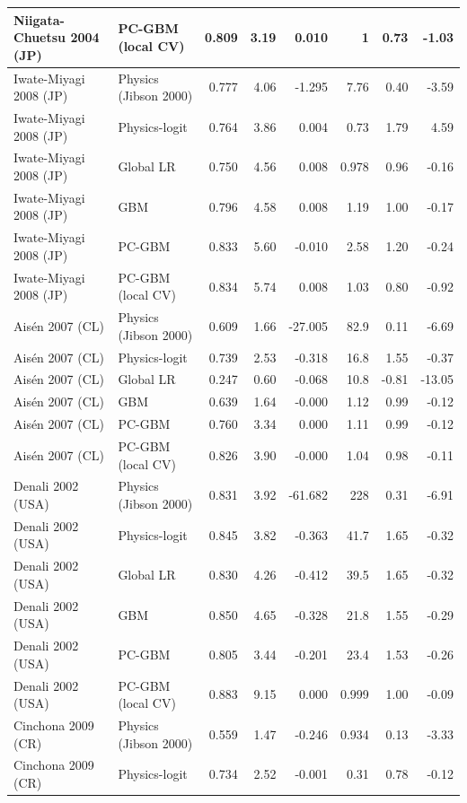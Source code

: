 \begin{longtable}{llrrrrrr}
Niigata-Chuetsu 2004 (JP) & PC-GBM (local CV) & 0.809 & 3.19 & 0.010 & 1 & 0.73 & -1.03\\
\midrule
Iwate-Miyagi 2008 (JP) & Physics (Jibson 2000) & 0.777 & 4.06 & -1.295 & 7.76 & 0.40 & -3.59\\
Iwate-Miyagi 2008 (JP) & Physics-logit & 0.764 & 3.86 & 0.004 & 0.73 & 1.79 & 4.59\\
Iwate-Miyagi 2008 (JP) & Global LR & 0.750 & 4.56 & 0.008 & 0.978 & 0.96 & -0.16\\
Iwate-Miyagi 2008 (JP) & GBM & 0.796 & 4.58 & 0.008 & 1.19 & 1.00 & -0.17\\
Iwate-Miyagi 2008 (JP) & PC-GBM & 0.833 & 5.60 & -0.010 & 2.58 & 1.20 & -0.24\\
Iwate-Miyagi 2008 (JP) & PC-GBM (local CV) & 0.834 & 5.74 & 0.008 & 1.03 & 0.80 & -0.92\\
\midrule
Ais\'{e}n 2007 (CL) & Physics (Jibson 2000) & 0.609 & 1.66 & -27.005 & 82.9 & 0.11 & -6.69\\
Ais\'{e}n 2007 (CL) & Physics-logit & 0.739 & 2.53 & -0.318 & 16.8 & 1.55 & -0.37\\
Ais\'{e}n 2007 (CL) & Global LR & 0.247 & 0.60 & -0.068 & 10.8 & -0.81 & -13.05\\
Ais\'{e}n 2007 (CL) & GBM & 0.639 & 1.64 & -0.000 & 1.12 & 0.99 & -0.12\\
Ais\'{e}n 2007 (CL) & PC-GBM & 0.760 & 3.34 & 0.000 & 1.11 & 0.99 & -0.12\\
Ais\'{e}n 2007 (CL) & PC-GBM (local CV) & 0.826 & 3.90 & -0.000 & 1.04 & 0.98 & -0.11\\
\midrule
Denali 2002 (USA) & Physics (Jibson 2000) & 0.831 & 3.92 & -61.682 & 228 & 0.31 & -6.91\\
Denali 2002 (USA) & Physics-logit & 0.845 & 3.82 & -0.363 & 41.7 & 1.65 & -0.32\\
Denali 2002 (USA) & Global LR & 0.830 & 4.26 & -0.412 & 39.5 & 1.65 & -0.32\\
Denali 2002 (USA) & GBM & 0.850 & 4.65 & -0.328 & 21.8 & 1.55 & -0.29\\
Denali 2002 (USA) & PC-GBM & 0.805 & 3.44 & -0.201 & 23.4 & 1.53 & -0.26\\
Denali 2002 (USA) & PC-GBM (local CV) & 0.883 & 9.15 & 0.000 & 0.999 & 1.00 & -0.09\\
\midrule
Cinchona 2009 (CR) & Physics (Jibson 2000) & 0.559 & 1.47 & -0.246 & 0.934 & 0.13 & -3.33\\
Cinchona 2009 (CR) & Physics-logit & 0.734 & 2.52 & -0.001 & 0.31 & 0.78 & -0.12\\

\end{longtable}
